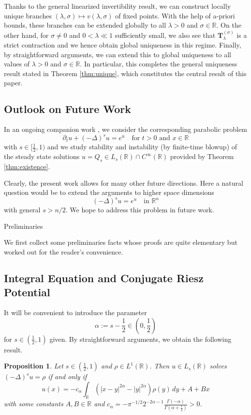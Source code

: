 \documentclass[reqno,10pt,a4paper]{amsart}
\makeatletter
\newtheorem{prop}{Proposition}[section]
\theoremstyle{definition}
\theoremstyle{definition}
\theoremstyle{remark}
\theoremstyle{remark}
\numberwithin{equation}{section}
\newcommand{\R}{\mathbb{R}}
\newcommand{\pt}{\partial}
\newcommand{\Ds}{(-\Delta)^{s}}
\newcommand{\Tss}{\mathbf{T}^{(\sigma)}_\lambda}
\def\section{\@startsection{section}{1}%
  \z@{1.5\linespacing\@plus\linespacing}{.5\linespacing}%
  {\normalfont\bfseries\large\centering}}
\makeatother
\begin{document}
Thanks to the general linearized invertibility result, we can construct locally unique branches $(\lambda, \sigma) \mapsto v(\lambda, \sigma)$ of fixed points. With the help of a-priori bounds, these branches can be extended globally to all $\lambda > 0$ and $\sigma \in \R$.  On the other hand, for $\sigma \neq 0$ and $0 < \lambda \ll 1$ sufficiently small, we also see that $\Tss$ is a strict contraction and we hence obtain global uniqueness in this regime. Finally, by straightforward arguments, we can extend this to global uniqueness to all values of $\lambda >0$ and $\sigma \in \R$. In particular, this completes the general uniqueness result stated in Theorem \ref{thm:unique}, which constitutes the central result of this paper.

\subsection{Outlook on Future Work}
In an ongoing companion work \cite{LaLe-25}, we consider the corresponding parabolic problem
$$
\pt_t u + \Ds u = e^u \quad \mbox{for $t > 0$ and $x \in \R$}
$$
with $s \in [\frac 1 2,1)$ and we study stability and instability (by finite-time blowup) of the steady state solutions $u=Q_s \in L_s(\R) \cap C^\infty(\R)$ provided by Theorem \ref{thm:existence}. 

Clearly, the present work allows for many other future directions. Here a natural question would be to extend the arguments to higher space dimensions
$$
\Ds u = e^u \quad \mbox{in $\R^n$}
$$ 
with general $s > n/2$. We hope to address this problem in future work.

 
\section{Preliminaries} \label{sec:prelim}

We first collect some preliminaries facts whose proofs are quite elementary but worked out for the reader's convenience. 


\subsection{Integral Equation and Conjugate Riesz Potential}
It will be convenient to introduce the parameter
$$
\alpha := s- \frac{1}{2} \in (0, \frac{1}{2})
$$
for  $s \in (\frac{1}{2}, 1)$ given. By straightforward arguments, we obtain the following result.

\begin{prop} \label{prop:integral_form}
Let $s \in (\frac{1}{2},1)$ and $\rho \in L^1(\R)$. Then $u \in L_s(\R)$ solves $\Ds u = \rho$ if and only if
$$
u(x) = -c_\alpha \int_{\R} \left ( |x-y|^{2 \alpha} - |y|^{2 \alpha} \right ) \rho(y) \, dy + A + B x
$$
with some constants $A, B \in \R$ and $c_\alpha = -\pi^{-1/2} 2^{-2\alpha-1} \frac{\Gamma(-\alpha)}{\Gamma(\alpha + \frac{1}{2})}>0$. 
\end{prop}
\end{document}

